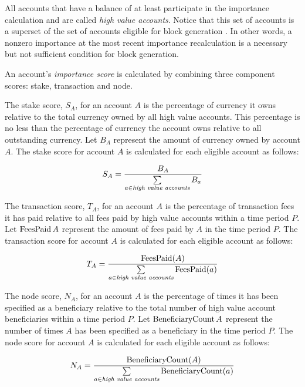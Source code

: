 All accounts that have a balance of at least  participate in the importance calculation and are called \emph{high value accounts}.
Notice that this set of accounts is a superset of the set of accounts eligible for block generation .
In other words, a nonzero importance at the most recent importance recalculation is a necessary but not sufficient condition for block generation.

An account's \emph{importance score} is calculated by combining three component scores: stake, transaction and node.

The stake score, $S_A$, for an account $A$ is the percentage of currency it owns relative to the total currency owned by all high value accounts.
This percentage is no less than the percentage of currency the account owns relative to all outstanding currency.
Let $B_A$ represent the amount of currency owned by account $A$.
The stake score for account $A$ is calculated for each eligible account as follows:

\begin{equation}
S_A = \frac{B_A}{\sum\limits_{\substack{a \in \textit{high value accounts}}} B_a}
\end{equation}

The transaction score, $T_A$, for an account $A$ is the percentage of transaction fees it has paid relative to all fees paid by high value accounts within a time period $P$.
Let $\operatorname{FeesPaid}{A}$ represent the amount of fees paid by $A$ in the time period $P$.
The transaction score for account $A$ is calculated for each eligible account as follows:

\begin{equation}
T_A = \frac{\operatorname{FeesPaid}(A)}{\sum\limits_{\substack{a \in \textit{high value accounts}}} \operatorname{FeesPaid}(a)}
\end{equation}

The node score, $N_A$, for an account $A$ is the percentage of times it has been specified as a beneficiary relative to the total number of high value account beneficiaries within a time period $P$.
Let $\operatorname{BeneficiaryCount}{A}$ represent the number of times $A$ has been specified as a beneficiary in the time period $P$.
The node score for account $A$ is calculated for each eligible account as follows:

\begin{equation}
N_A = \frac{\operatorname{BeneficiaryCount}(A)}{\sum\limits_{\substack{a \in \textit{high value accounts}}} \operatorname{BeneficiaryCount}(a)}
\end{equation}

